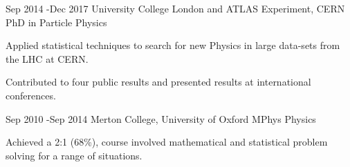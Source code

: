 \documentclass[10pt]{article} %
\begin{document}
\job
{Sep 2014 -}{Dec 2017}
{University College London and ATLAS Experiment, CERN}
{}
{PhD in Particle Physics}
{
  \begin{itemize-noindent}
  \item{Applied statistical techniques to search for new Physics in large data-sets from the LHC at CERN.}
  \item{Contributed to four public results and presented results at international conferences.}
  \end{itemize-noindent}
}

\job
{Sep 2010 -}{Sep 2014}
{Merton College, University of Oxford}
{}
{MPhys Physics}
{
  \begin{itemize-noindent}
  \item{Achieved a 2:1 (68\%), course involved mathematical and statistical problem solving for a range of situations.}
  \end{itemize-noindent}
}
\end{document}
